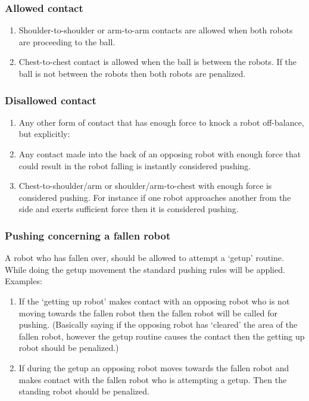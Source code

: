 \documentclass[12pt]{article}
\begin{document}
\subsubsection{Allowed contact}

\begin{enumerate}

\item Shoulder-to-shoulder or arm-to-arm contacts are allowed when both robots are proceeding to the ball.

\item Chest-to-chest contact is allowed when the ball is between the robots. If the ball is not between the robots then both robots are penalized.

\end{enumerate}

\subsubsection{Disallowed contact}

\begin{enumerate}

\item Any other form of contact that has enough force to knock a robot off-balance, but explicitly:

\item Any contact made into the back of an opposing robot with enough force that could result in the robot falling is instantly considered pushing.

\item Chest-to-shoulder/arm or shoulder/arm-to-chest with enough force is considered pushing. For instance if one robot approaches another from the side and exerts sufficient force then it is considered pushing.

\end{enumerate}

\subsubsection{Pushing concerning a fallen robot}

A robot who has fallen over, should be allowed to attempt a `getup' 
routine. While doing the getup movement the standard pushing rules will be applied. Examples:

\begin{enumerate}

\item If the `getting up robot' makes contact with an opposing robot who is not moving towards the fallen robot then the fallen robot will be called for pushing. (Basically saying if the opposing robot has `cleared' the area of the fallen robot, however the getup routine causes the contact then the getting up robot should be penalized.)

\item If during the getup an opposing robot moves towards the fallen robot and makes contact with the fallen robot who is attempting a getup. 
Then the standing robot should be penalized.

\end{enumerate}
\end{document}
